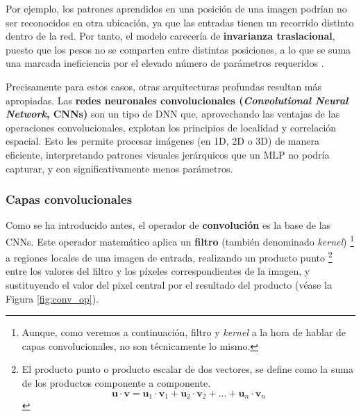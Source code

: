 Por ejemplo, los patrones aprendidos en una posición de una imagen podrían no ser reconocidos en otra 
ubicación, ya que las entradas tienen un recorrido distinto dentro de la red. Por tanto, el modelo carecería       %
de \textbf{invarianza traslacional}, puesto que los pesos no se comparten entre distintas posiciones, a lo que 
se suma una marcada ineficiencia por el elevado número de parámetros requeridos \cite{szeliski2010}.

Precisamente para estos casos, otras arquitecturas profundas resultan más apropiadas.
Las \textbf{redes neuronales convolucionales (\textit{Convolutional Neural Network}, CNNs)} son un 
tipo de DNN que, aprovechando las ventajas de las operaciones convolucionales, explotan los principios de 
localidad y correlación espacial. Esto les permite procesar imágenes (en 1D, 2D o 3D) de manera eficiente, 
interpretando patrones visuales jerárquicos que un MLP no podría capturar, y con significativamente menos 
parámetros.


\subsubsection{Capas convolucionales}

Como se ha introducido antes, el operador de \textbf{convolución} es la base de las CNNs. Este operador 
matemático aplica un \textbf{filtro} (también denominado \textit{kernel})
\footnote{
    Aunque, como veremos a continuación, filtro y \textit{kernel} a la hora de hablar de capas 
    convolucionales, no son técnicamente lo mismo.
} 
a regiones locales de una imagen de entrada, realizando un producto punto
\footnote{
    El producto punto o producto escalar de dos vectores, se define como la suma de los productos componente a 
    componente. 
    $$
    \mathbf{u} \cdot \mathbf{v} = \mathbf{u}_1 \cdot \mathbf{v}_1 + \mathbf{u}_2 \cdot \mathbf{v}_2 + ... + 
    \mathbf{u}_n \cdot \mathbf{v}_n
    $$
} 
entre los valores del filtro y los píxeles correspondientes de la imagen, y sustituyendo el valor del pixel 
central por el resultado del producto (véase la Figura \ref{fig:conv_op}).

